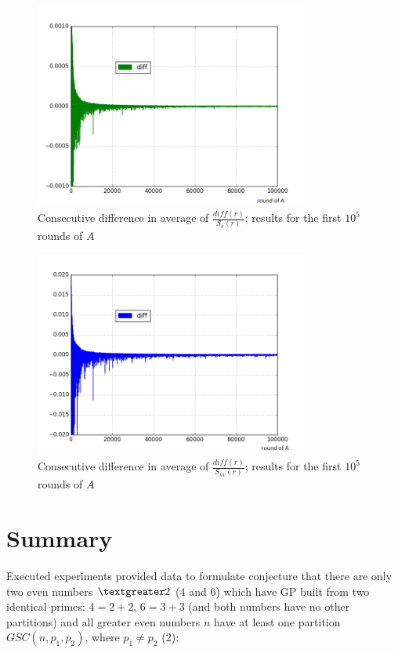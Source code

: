 \documentclass[10pt,twocolumn]{article}
\begin{document}
\begin{figure}[!ht]
\centering
\captionsetup{justification=centering}
\includegraphics[width=9cm]{f_sumbuild_ratio_alr_ver_diff}
\caption[caption]{Consecutive difference in average of $\frac{diff(r)}{S_v(r)}$; results for the first $10^5$ rounds of $A$}
\label{fig:sumbuildratioalrverdiff}
\end{figure}

\begin{figure}[!ht]
\centering
\captionsetup{justification=centering}
\includegraphics[width=9cm]{f_sumbuild_ratio_to_be_ver_diff}
\caption[caption]{Consecutive difference in average of $\frac{diff(r)}{S_{nv}(r)}$; results for the first $10^5$ rounds of $A$}
\label{fig:sumbuildratiotobeverdiff}
\end{figure}

\section{Summary}

Executed experiments provided data to formulate conjecture that there are only two even numbers $\textgreater 2$ (4 and 6) which have GP built from two identical primes: $4 = 2 + 2$, $6 = 3 + 3$ (and both numbers have no other partitions) and all greater even numbers $n$ have at least one partition $GSC(n, p_1, p_2)$, where $p_1 \neq p_2$ (2):
\end{document}
